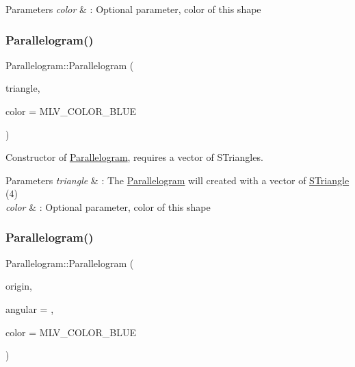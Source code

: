 \begin{DoxyParams}{Parameters}
{\em color} & \+: Optional parameter, color of this shape \\
\hline
\end{DoxyParams}
\mbox{\label{classParallelogram_ac60d6fc9e306b202e9c679d170d6d063}} 
\subsubsection{\texorpdfstring{Parallelogram()}{Parallelogram()}\hspace{0.1cm}{\footnotesize\ttfamily [2/3]}}
{\footnotesize\ttfamily Parallelogram\+::\+Parallelogram (\begin{DoxyParamCaption}\item[{const std\+::vector$<$ \hyperlink{classSTriangle}{S\+Triangle} $>$ \&}]{triangle,  }\item[{M\+L\+V\+\_\+\+Color}]{color = {\ttfamily MLV\+\_\+COLOR\+\_\+BLUE} }\end{DoxyParamCaption})\hspace{0.3cm}{\ttfamily [explicit]}}



Constructor of \hyperlink{classParallelogram}{Parallelogram}, requires a vector of S\+Triangles. 


\begin{DoxyParams}{Parameters}
{\em triangle} & \+: The \hyperlink{classParallelogram}{Parallelogram} will created with a vector of \hyperlink{classSTriangle}{S\+Triangle} (4) \\
\hline
{\em color} & \+: Optional parameter, color of this shape \\
\hline
\end{DoxyParams}
\mbox{\label{classParallelogram_aeed0c83e942a4869b79d4baab00c2874}} 
\subsubsection{\texorpdfstring{Parallelogram()}{Parallelogram()}\hspace{0.1cm}{\footnotesize\ttfamily [3/3]}}
{\footnotesize\ttfamily Parallelogram\+::\+Parallelogram (\begin{DoxyParamCaption}\item[{const \hyperlink{classPoint}{Point}$<$ double $>$ \&}]{origin,  }\item[{double}]{angular = {},  }\item[{M\+L\+V\+\_\+\+Color}]{color = {\ttfamily MLV\+\_\+COLOR\+\_\+BLUE} }\end{DoxyParamCaption})\hspace{0.3cm}{\ttfamily [explicit]}}



